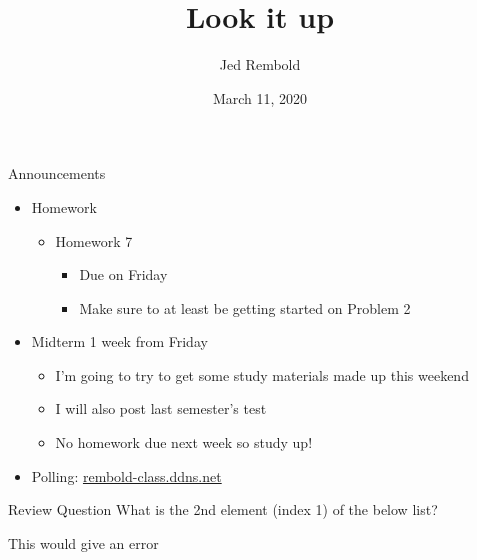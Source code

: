 \documentclass[pdf, aspectratio=169, 12pt]{beamer}
\title{Look it up}
\author{Jed Rembold}
\date{March 11, 2020}
\begin{document}
\begin{frame}{Announcements}
	\begin{itemize}
		\item Homework
			\begin{itemize}
				\item Homework 7 
					\begin{itemize}
						\item Due on Friday
						\item Make sure to at least be getting started on Problem 2
					\end{itemize}
			\end{itemize}
		\item Midterm 1 week from Friday
			\begin{itemize}
				\item I'm going to try to get some study materials made up this weekend
				\item I will also post last semester's test
				\item No homework due next week so study up!
			\end{itemize}
		\item Polling: \url{rembold-class.ddns.net}
	\end{itemize}
\end{frame}

\begin{frame}{Review Question}
	What is the 2nd element (index 1) of the below list?
	\begin{center}
	\end{center}
	\begin{poll}
	\item {}
	\item {}
	\item {}
	\item This would give an error
	\end{poll}
\end{frame}


\end{document}
